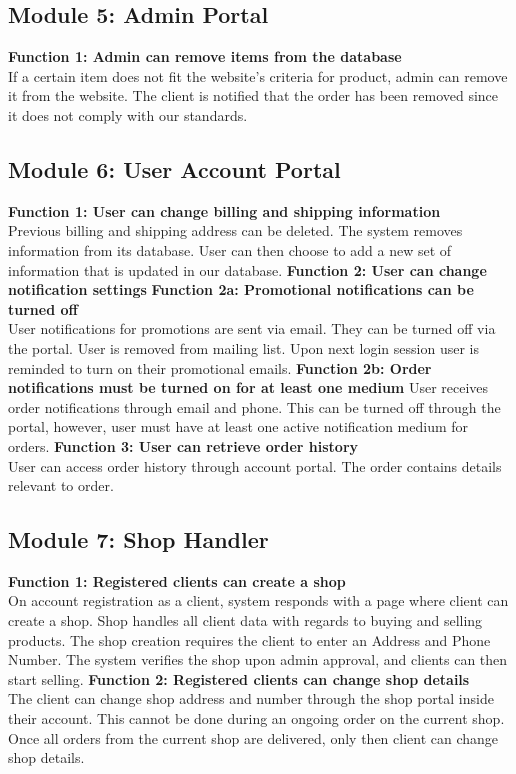 \subsection*{Module 5: Admin Portal}
\begin{outline}
    \1 \textbf{Function 1: Admin can remove items from the database}\\
    If a certain item does not fit the website's criteria for product, admin can remove it from the website. The client is notified that the order has been removed since it does not comply with our standards.
\end{outline}
\subsection*{Module 6: User Account Portal}
\begin{outline}
    \1 \textbf{Function 1: User can change billing and shipping information}\\
    Previous billing and shipping address can be deleted. The system removes information from its database. User can then choose to add a new set of information that is updated in our database.
    \1 \textbf{Function 2: User can change notification settings}
        \2 \textbf{Function 2a: Promotional notifications can be turned off}\\
        User notifications for promotions are sent via email. They can be turned off via the portal. User is removed from mailing list. Upon next login session user is reminded to turn on their promotional emails.
        \2 \textbf{Function 2b: Order notifications must be turned on for at least one medium}
        User receives order notifications through email and phone. This can be turned off through the portal, however, user must have at least one active notification medium for orders.
    \1 \textbf{Function 3: User can retrieve order history}\\
    User can access order history through account portal. The order contains details relevant to order.
\end{outline}
\subsection*{Module 7: Shop Handler}
\begin{outline}
    \1 \textbf{Function 1: Registered clients can create a shop}\\
    On account registration as a client, system responds with a page where client can create a shop. Shop handles all client data with regards to buying and selling products. The shop creation requires the client to enter an Address and Phone Number. The system verifies the shop upon admin approval, and clients can then start selling.
    \1 \textbf{Function 2: Registered clients can change shop details}\\
    The client can change shop address and number through the shop portal inside their account. This cannot be done during an ongoing order on the current shop. Once all orders from the current shop are delivered, only then client can change shop details.
\end{outline}

